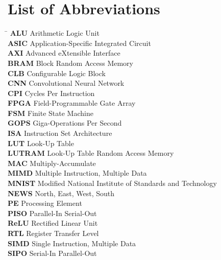 \section*{\bfseries\Large List of Abbreviations}
\begin{tabbing}
\hspace{3.5cm}\=\kill
\textbf{ALU}     \> Arithmetic Logic Unit \\
\textbf{ASIC}    \> Application-Specific Integrated Circuit \\
\textbf{AXI}     \> Advanced eXtensible Interface \\
\textbf{BRAM}    \> Block Random Access Memory \\
\textbf{CLB}     \> Configurable Logic Block \\
\textbf{CNN}     \> Convolutional Neural Network \\
\textbf{CPI}     \> Cycles Per Instruction \\
\textbf{FPGA}    \> Field-Programmable Gate Array \\
\textbf{FSM}     \> Finite State Machine \\
\textbf{GOPS}    \> Giga-Operations Per Second \\
\textbf{ISA}     \> Instruction Set Architecture \\
\textbf{LUT}     \> Look-Up Table \\
\textbf{LUTRAM}  \> Look-Up Table Random Access Memory \\
\textbf{MAC}     \> Multiply-Accumulate \\
\textbf{MIMD}    \> Multiple Instruction, Multiple Data \\
\textbf{MNIST}   \> Modified National Institute of Standards and Technology \\
\textbf{NEWS}    \> North, East, West, South \\
\textbf{PE}      \> Processing Element \\
\textbf{PISO}    \> Parallel-In Serial-Out \\
\textbf{ReLU}    \> Rectified Linear Unit \\
\textbf{RTL}     \> Register Transfer Level \\
\textbf{SIMD}    \> Single Instruction, Multiple Data \\
\textbf{SIPO}    \> Serial-In Parallel-Out \\
\end{tabbing}
\clearpage

\begin{uomoriginality}
  \uomoriginalitydeclaration 
\end{uomoriginality}
\uomcopyrightstatement



